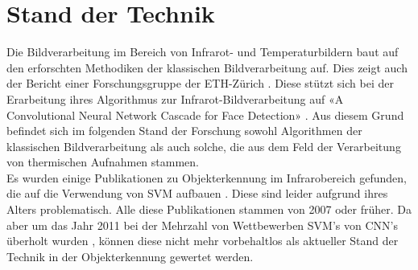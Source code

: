 \chapter{Stand der Technik}
\label{ch:StandDerTechnik}

Die Bildverarbeitung im Bereich von Infrarot- und Temperaturbildern baut auf den erforschten Methodiken der klassischen Bildverarbeitung auf. Dies zeigt auch der Bericht einer Forschungsgruppe der ETH-Zürich \parencite{gomez2018thermal}. Diese stützt sich bei der Erarbeitung ihres Algorithmus zur Infrarot-Bildverarbeitung auf «A Convolutional Neural Network Cascade for Face Detection» \parencite{li2015convolutional}. Aus diesem Grund befindet sich im folgenden Stand der Forschung sowohl Algorithmen der klassischen Bildverarbeitung als auch solche, die aus dem Feld der Verarbeitung von thermischen Aufnahmen stammen.\\
Es wurden einige Publikationen zu Objekterkennung im Infrarobereich gefunden, die auf die Verwendung von \gls{SVM} aufbauen \parencite{suard2006pedestrian, bertozzi2003pedestrian, zhang2007pedestrian}. Diese sind leider aufgrund ihres Alters problematisch. Alle diese Publikationen stammen von 2007 oder früher. Da aber um das Jahr 2011 bei der Mehrzahl von Wettbewerben \gls{SVM}'s von \gls{CNN}'s überholt wurden \parencite{Historyo5:online}, können diese nicht mehr vorbehaltlos als aktueller Stand der Technik in der Objekterkennung gewertet werden.

